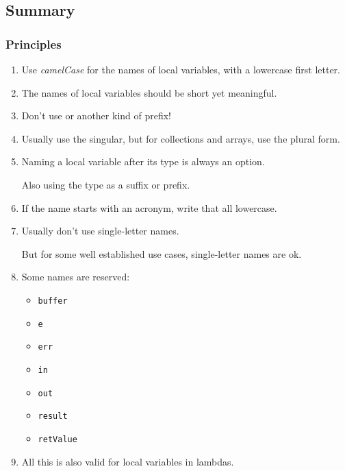 
\subsection{Summary}

\subsubsection{Principles}
\begin{enumerate}[label=P\arabic*.]
	\item{Use \textit{camelCase} for the names of local variables, with a lowercase first letter.}

	\item{The names of local variables should be short yet meaningful.}
	
	\item{Don't use  or another kind of prefix!}
	
	\item{Usually use the singular, but for collections and arrays, use the plural form.}
	
	\item{Naming a local variable after its type is always an option.
	
	Also using the type as a suffix or prefix.}
	
	\item{If the name starts with an acronym, write that all lowercase.}
	
	\item{Usually don't use single-letter names.
	
	But for some well established use cases, single-letter names are ok.}
	
	\item{Some names are reserved:
	\begin{itemize}[nosep]
		\item{\lstinline|buffer|}
		\item{\lstinline|e|}
		\item{\lstinline|err|}
		\item{\lstinline|in|}
		\item{\lstinline|out|}
		\item{\lstinline|result|}
		\item{\lstinline|retValue|}
	\end{itemize}}
	
	\item{All this is also valid for local variables in lambdas.}
\end{enumerate}

